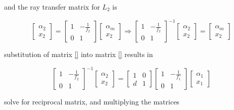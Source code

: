 \documentclass[main.tex]{subfiles}
\begin{document}
and the ray transfer matrix for $L_2$ is

\begin{equation}
\begin{bmatrix}
    \alpha_2 \\
    x_2
\end{bmatrix}
=
\begin{bmatrix}
    1   & -\frac{1}{f_2} \\
    0   &   1
\end{bmatrix}
\begin{bmatrix}
    \alpha_{m}  \\
    x_2
\end{bmatrix}
\Rightarrow
\begin{bmatrix}
    1   & -\frac{1}{f_2} \\
    0   &   1
\end{bmatrix}^{-1}
\begin{bmatrix}
    \alpha_2 \\
    x_2
\end{bmatrix}
=
\begin{bmatrix}
    \alpha_{m}  \\
    x_2
\end{bmatrix}
\end{equation}

substitution of matrix \ref{} into matrix \ref{} results in

\begin{equation}
\begin{bmatrix}
    1   & -\frac{1}{f_2} \\
    0   &   1
\end{bmatrix}^{-1}
\begin{bmatrix}
    \alpha_2 \\
    x_2
\end{bmatrix}
=
\begin{bmatrix}
    1   &   0 \\
    d   &   1
\end{bmatrix}
\begin{bmatrix}
    1   & -\frac{1}{f_1} \\
    0   &   1
\end{bmatrix}
\begin{bmatrix}
     \alpha_{1} \\
    x_1
\end{bmatrix}
\end{equation}

solve for reciprocal matrix, and multiplying the matrices 
\end{document}
